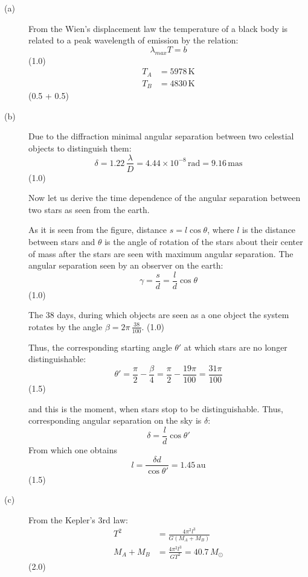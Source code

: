 \begin{description}
\item[(a)] From the Wien's displacement law the temperature of a black body is
  related to a peak wavelength of emission by the relation:
  \[ \lambda_{max} T = b \]
  \hfill(1.0)
  \begin{align*}
    T_A &= 5978\,\mathrm{K} \\
    T_B &= 4830\,\mathrm{K}
  \end{align*}
  \hfill(0.5 + 0.5)

\item[(b)] Due to the diffraction minimal angular separation between two
  celestial objects to distinguish them:
  \[ \delta = 1.22\,\frac{\lambda}{D} = 4.44 \times 10^{-8}\,\mathrm{rad}
     = 9.16\,\mathrm{mas} \]
  \hfill(1.0)

  Now let us derive the time dependence of the angular separation between two
  stars as seen from the earth.


  As it is seen from the figure, distance $s = l\cos\theta$, where $l$ is the
  distance between stars and $\theta$ is the angle of rotation of the stars
  about their center of mass after the stars are seen with maximum angular
  separation. The angular separation seen by an observer on the earth:
  \[ \gamma = \frac{s}{d} = \frac{l}{d}\cos\theta \]
  \hfill(1.0)

  The 38 days, during which objects are seen as a one object the system rotates
  by the angle $\beta = 2\pi\,\frac{38}{100}$. \hfill(1.0)

  Thus, the corresponding starting angle $\theta'$ at which stars are no longer
  distinguishable:
  \[ \theta' = \frac{\pi}{2} - \frac{\beta}{4}
     = \frac{\pi}{2} - \frac{19\pi}{100} = \frac{31\pi}{100} \]
  \hfill(1.5)

  and this is the moment, when stars stop to be distinguishable. Thus,
  corresponding angular separation on the sky is $\delta$:
  \[ \delta = \frac{l}{d}\cos\theta' \]
  From which one obtains
  \[ l = \frac{\delta d}{\cos\theta'} = 1.45\,\mathrm{au} \]
  \hfill(1.5)

\item[(c)] From the Kepler's 3rd law:
  \begin{align*}
    T^2 &= \frac{4\pi^2 l^3}{G(M_A + M_B)} \\
    M_A + M_B &= \frac{4\pi^2 l^3}{G T^2} = 40.7\,M_\odot
  \end{align*}
  \hfill(2.0)


\end{description}
